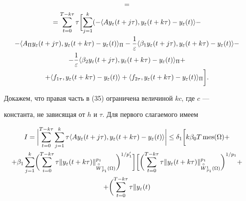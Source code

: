 \begin{pf}
\begin{gather}
=\notag\\ 


=\sum^{T-k\tau}_{t=0}\tau\biggl [\sum^k_{j=1}(-\langle Ay_\varepsilon 


(t+j\tau), y_\varepsilon(t+k\tau)-y_\varepsilon(t)\rangle -\notag\\ 


-\langle A_\Pi y_\varepsilon(t+j\tau), y_\varepsilon(t+k\tau)- 


y_\varepsilon(t)\rangle_\Pi - 


\frac{1}{\varepsilon}\langle \beta_1 y_\varepsilon(t+j\tau), 


y_\varepsilon(t+k\tau)-y_\varepsilon(t)\rangle -\notag\\ 


-\frac{1}{\varepsilon}\langle \beta_2 y_\varepsilon(t+j\tau), 


y_\varepsilon(t+k\tau)-y_\varepsilon(t)\rangle_\Pi +\notag\\ 


+\langle f_{1\tau},y_\varepsilon(t+k\tau) - y_\varepsilon(t)\rangle + 


\langle f_{2\tau},y_\varepsilon(t+k\tau) - y_\varepsilon(t)\rangle_\Pi


\biggr ]. 


\end{gather} 


Докажем, что правая часть в (35) ограничена величиной $kc$, где $c$ --- 


константа, не зависящая от $h$ и $\tau$. Для первого слагаемого имеем 


\begin{gather*} 


I=\biggl |\sum^{T-k\tau}_{t=0}\sum^k_{j=1}\tau 


\langle A y_\varepsilon(t+j\tau), y_\varepsilon(t+k\tau)- 


y_\varepsilon(t)\rangle\biggr | \le 


\delta_1 \biggl [ k\beta_0T\mes(\Omega) +\\ 


+\beta_1\sum^k_{j=1}\biggl (\sum^{T-k\tau}_{i=0}\tau\|y_\varepsilon(t+k\tau) 


\|^{p_1}_{\oc W{}^1_{p_1}(\Omega)}\biggr )^{1/p'_1}\biggr ]\biggl [\biggl ( 


\sum^{T-k\tau}_{t=0}\tau\|y_\varepsilon(t+k\tau)


\|^{p_1}_{\oc W{}^1_{p_1}(\Omega)}\biggr )^{1/p_1}+\\ 


+\biggl (\sum^{T-k\tau}_{t=0}\tau\|y_\varepsilon(t)



\end{gather*}
\end{pf}
